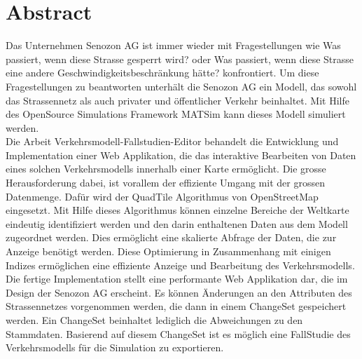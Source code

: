 \chapter{Abstract}
Das Unternehmen Senozon AG ist immer wieder mit Fragestellungen wie \glqq{}Was passiert, wenn diese Strasse gesperrt wird?\grqq{} oder \glqq{}Was passiert, wenn diese Strasse eine andere Geschwindigkeitsbeschränkung hätte?\grqq{} konfrontiert. Um diese Fragestellungen zu beantworten unterhält die Senozon AG ein Modell, das sowohl das Strassennetz als auch privater und öffentlicher Verkehr beinhaltet. Mit Hilfe des OpenSource Simulations Framework MATSim kann dieses Modell simuliert werden.\\
Die Arbeit \glqq{}Verkehrsmodell-Fallstudien-Editor\grqq{} behandelt die Entwicklung und Implementation einer Web Applikation, die das interaktive Bearbeiten von Daten eines solchen Verkehrsmodells innerhalb einer Karte ermöglicht. Die grosse Herausforderung dabei, ist vorallem der effiziente Umgang mit der grossen Datenmenge. Dafür wird der QuadTile Algorithmus von OpenStreetMap \cite{OSMQuadTiles} eingesetzt. Mit Hilfe dieses Algorithmus können einzelne Bereiche der Weltkarte eindeutig identifiziert werden und den darin enthaltenen Daten aus dem Modell zugeordnet werden. Dies ermöglicht eine skalierte Abfrage der Daten, die zur Anzeige benötigt werden. Diese Optimierung in Zusammenhang mit einigen Indizes ermöglichen eine effiziente Anzeige und Bearbeitung des Verkehrsmodells.\\
Die fertige Implementation stellt eine performante Web Applikation dar, die im Design der Senozon AG erscheint. Es können Änderungen an den Attributen des Strassennetzes vorgenommen werden, die dann in einem ChangeSet gespeichert werden. Ein ChangeSet beinhaltet lediglich die Abweichungen zu den Stammdaten. Basierend auf diesem ChangeSet ist es  möglich eine FallStudie des Verkehrsmodells für die Simulation zu exportieren.\\